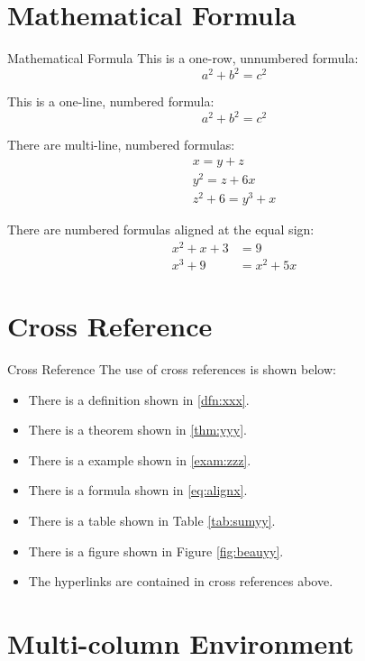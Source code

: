 \documentclass[compress,10pt,dvipsnames,notheorems]{beamer} %
\begin{document}
\section{Mathematical Formula}%
\begin{frame}{Mathematical Formula}
	This is a one-row, unnumbered formula:
	\[ a^2 + b^2 = c^2 \]

	This is a one-line, numbered formula:
	\begin{equation}
		a^2 + b^2 = c^2
	\end{equation}

	There are multi-line, numbered formulas:
	\begin{gather}
		x = y + z \\
		y^2 = z + 6x \\
		z^2 + 6 = y^3 + x
	\end{gather}

	There are numbered formulas aligned at the equal sign:
	\begin{align}
		x^2 + x + 3 &= 9 \label{eq:alignx} \\
		x^3 + 9 &= x^2 + 5x \label{eq:aligny}
	\end{align}
\end{frame}

\section{Cross Reference}

\begin{frame}{Cross Reference}
	The use of cross references is shown below:
	\begin{itemize}
		\item There is a definition shown in \ref{dfn:xxx}.
		\item There is a theorem shown in \ref{thm:yyy}.
		\item There is a example shown in \ref{exam:zzz}.
		\item There is a formula shown in \eqref{eq:alignx}.
		\item There is a table shown in Table \ref{tab:sumyy}.
		\item There is a figure shown in Figure \ref{fig:beauyy}.
		\item The hyperlinks are contained in cross references above.
	\end{itemize}
\end{frame}

\section{Multi-column Environment}%
\end{document}
